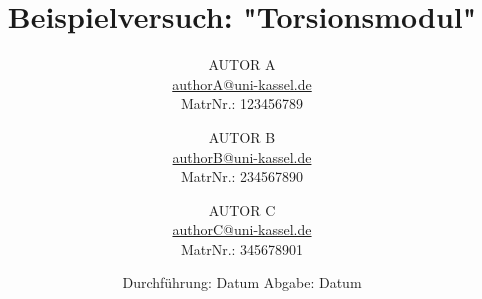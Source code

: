 

\author{%
  AUTOR A\\%
  \href{mailto:authorA@uni-kassel.de}{authorA@uni-kassel.de}\\%
  MatrNr.: 123456789\\%
  \and%
  AUTOR B\\%
  \href{mailto:authorB@uni-kassel.de}{authorB@uni-kassel.de}\\%
  MatrNr.: 234567890\\%
  \and%
  AUTOR C\\%
  \href{mailto:authorC@uni-kassel.de}{authorC@uni-kassel.de}\\%
  MatrNr.: 345678901\\%
}
\publishers{Betreuer: Arne Vereijken / Adrian Krone\\Universität Kassel – Institut für Physik und CINSaT}

\subject{V0}
\title{Beispielversuch: "Torsionsmodul"}
\date{%
  Durchführung: Datum
  \hspace{3em}
  Abgabe: Datum
}



\maketitle
\thispagestyle{empty}
\tableofcontents
\newpage






\printbibliography{}

